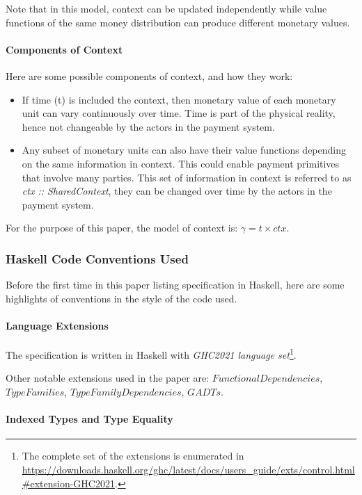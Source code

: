 Note that in this model, context can be updated independently while value functions of the same
money distribution can produce different monetary values.

\paragraph{Components of Context}

Here are some possible components of context, and how they work:

\begin{itemize}
    \item If time (t) is included the context, then monetary value of each monetary unit can vary
continuously over time. Time is part of the physical reality, hence not changeable by the actors in
the payment system.

    \item Any subset of monetary units can also have their value functions depending on the same
information in context. This could enable payment primitives that involve many parties. This set of
information in context is referred to as \textit{ctx :: SharedContext}, they can be changed over
time by the actors in the payment system.
\end{itemize}

For the purpose of this paper, the model of context is: $\gamma = t \times ctx$.

\subsubsection{Haskell Code Conventions Used}

Before the first time in this paper listing specification in Haskell, here are some highlights of
conventions in the style of the code used.

\paragraph{Language Extensions}

The specification is written in Haskell with \textit{GHC2021 language set}\footnote{The complete set
of the extensions is enumerated in
\url{https://downloads.haskell.org/ghc/latest/docs/users_guide/exts/control.html\#extension-GHC2021}.}.

Other notable extensions used in the paper are: $FunctionalDependencies$, $TypeFamilies$,
$TypeFamilyDependencies$, $GADTs$.

\paragraph{Indexed Types and Type Equality}

